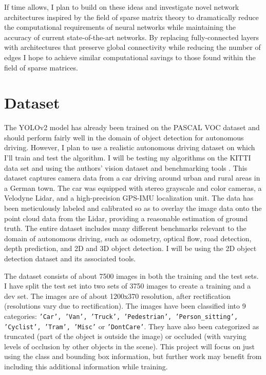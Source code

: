 \documentclass[10pt,letterpaper]{article}
\begin{document}
	If time allows, I plan to build on these ideas and investigate novel network architectures inspired by the field of sparse matrix theory to dramatically reduce the computational requirements of neural networks while maintaining the accuracy of current state-of-the-art networks. By replacing fully-connected layers with architectures that preserve global connectivity while reducing the number of edges I hope to achieve similar computational savings to those found within the field of sparse matrices. 
	
	\section{Dataset}
	The YOLOv2 model has already been trained on the PASCAL VOC dataset and should perform fairly well in the domain of object detection for autonomous driving. However, I plan to use a realistic autonomous driving dataset on which I'll train and test the algorithm. I will be testing my algorithms on the KITTI data set \cite{KITTIDataset} and using the authors' vision dataset and benchmarking tools \cite{KITTIVision}. This dataset captures camera data from a car driving around urban and rural areas in a German town. The car was equipped with stereo grayscale and color cameras, a Velodyne Lidar, and a high-precision GPS-IMU localization unit. The data has been meticulously labeled and calibrated so as to overlay the image data onto the point cloud data from the Lidar, providing a reasonable estimation of ground truth. The entire dataset includes many different benchmarks relevant to the domain of autonomous driving, such as odometry, optical flow, road detection, depth prediction, and 2D and 3D object detection. I will be using the 2D object detection dataset and its associated tools. 
	
	The dataset consists of about 7500 images in both the training and the test sets. I have split the test set into two sets of 3750 images to create a training and a dev set. The images are of about 1200x370 resolution, after rectification (resolutions vary due to rectification). The images have been classified into 9 categories: \texttt{'Car', 'Van', 'Truck',	'Pedestrian', 'Person\_sitting', 'Cyclist', 'Tram', 'Misc'} or \texttt{'DontCare'}. They have also been categorized as truncated (part of the object is outside the image) or occluded (with varying levels of occlusion by other objects in the scene). This project will focus on just using the class and bounding box information, but further work may benefit from including this additional information while training. 
	
\end{document}
